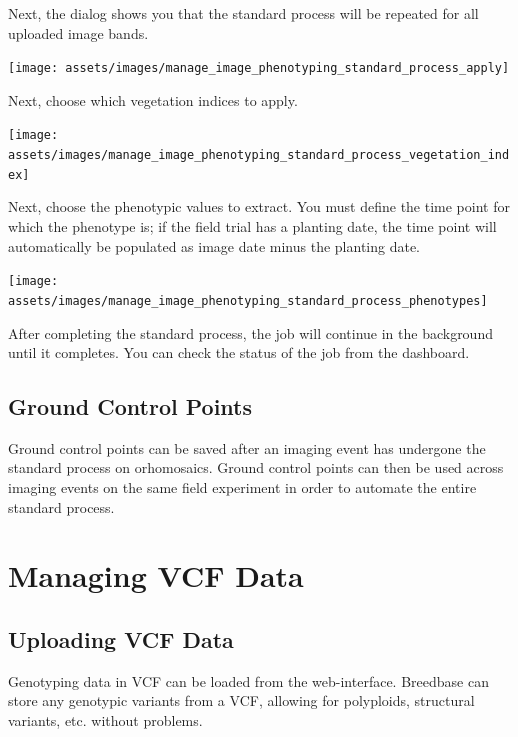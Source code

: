 \documentclass[
  12pt,
]{book}
\begin{document}
Next, the dialog shows you that the standard process will be repeated for all uploaded image bands.

\begin{center}\texttt{[image: assets/images/manage\_image\_phenotyping\_standard\_process\_apply]} \end{center}

Next, choose which vegetation indices to apply.

\begin{center}\texttt{[image: assets/images/manage\_image\_phenotyping\_standard\_process\_vegetation\_index]} \end{center}

Next, choose the phenotypic values to extract. You must define the time point for which the phenotype is; if the field trial has a planting date, the time point will automatically be populated as image date minus the planting date.

\begin{center}\texttt{[image: assets/images/manage\_image\_phenotyping\_standard\_process\_phenotypes]} \end{center}

After completing the standard process, the job will continue in the background until it completes. You can check the status of the job from the dashboard.

\hypertarget{ground-control-points}{%
\section{Ground Control Points}\label{ground-control-points}}

Ground control points can be saved after an imaging event has undergone the standard process on orhomosaics. Ground control points can then be used across imaging events on the same field experiment in order to automate the entire standard process.

\hypertarget{managing-vcf-data}{%
\chapter{Managing VCF Data}\label{managing-vcf-data}}

\hypertarget{uploading-vcf-data}{%
\section{Uploading VCF Data}\label{uploading-vcf-data}}

Genotyping data in VCF can be loaded from the web-interface. Breedbase can store any genotypic variants from a VCF, allowing for polyploids, structural variants, etc. without problems.
\end{document}
